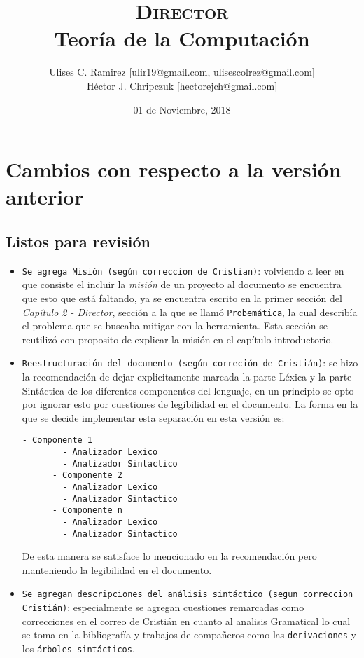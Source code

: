 \documentclass{report}
\title{\textsc{Director}\\Teoría de la Computación}
\author{Ulises C. Ramirez [ulir19@gmail.com, ulisescolrez@gmail.com]\\Héctor J.
Chripczuk [hectorejch@gmail.com]}
\date{01 de Noviembre, 2018}
\begin{document}
\maketitle
{}
\newpage

\section*{Cambios con respecto a la versión anterior}

\subsection*{Listos para revisión}

\begin{itemize}
  \item \texttt{Se agrega Misión (según correccion de Cristian)}: volviendo a
    leer en que consiste el incluir la \textit{misión} de un proyecto al documento
    se encuentra que esto que está faltando, ya se encuentra escrito en la primer
    sección del \textit{Capítulo 2 - Director}, sección a la que se llamó
    \texttt{Probemática}, la cual describía el problema que se buscaba mitigar
    con la herramienta.
    Esta sección se reutilizó con proposito de explicar la misión en el
    capítulo introductorio.
  \item \texttt{Reestructuración del documento (según correción de Cristián)}:
    se hizo la recomendación de dejar explicitamente marcada la parte Léxica y
    la parte Sintáctica de los diferentes componentes del lenguaje, en un
    principio se opto por ignorar esto por cuestiones de legibilidad en el
    documento.
    La forma en la que se decide implementar esta separación en esta versión
    es:
    \begin{lstlisting}[basicstyle=\footnotesize]
      - Componente 1
        - Analizador Lexico
        - Analizador Sintactico
      - Componente 2
        - Analizador Lexico
        - Analizador Sintactico
      - Componente n
        - Analizador Lexico
        - Analizador Sintactico
    \end{lstlisting}

    De esta manera se satisface lo mencionado en la recomendación pero
    manteniendo la legibilidad en el documento.
  \item \texttt{Se agregan descripciones del análisis sintáctico (segun
    correccion Cristián)}:
    especialmente se agregan cuestiones remarcadas como correcciones en el
    correo de Cristián en cuanto al analisis Gramatical lo cual se toma en la
    bibliografía y trabajos de compañeros como las \texttt{derivaciones} y los
    \texttt{árboles sintácticos}.
\end{itemize}
\end{document}
